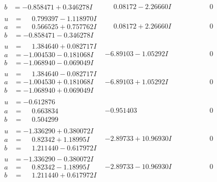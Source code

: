 \documentclass[1p]{elsarticle_modified}
\theoremstyle{definition}
\begin{document}
$$\begin{array}{c|c|c}
\begin{aligned}
b &= -0.858471 + 0.346278 I\end{aligned}
 & \phantom{-}0.08172 - 2.26660 I & \phantom{-0.000000 } 0 \\ \hline\begin{aligned}
u &= \phantom{-}0.799397 - 1.118970 I \\
a &= \phantom{-}0.566525 + 0.757762 I \\
b &= -0.858471 - 0.346278 I\end{aligned}
 & \phantom{-}0.08172 + 2.26660 I & \phantom{-0.000000 } 0 \\ \hline\begin{aligned}
u &= \phantom{-}1.384640 + 0.082717 I \\
a &= -1.004530 - 0.181068 I \\
b &= -1.068940 - 0.069049 I\end{aligned}
 & -6.89103 - 1.05292 I & \phantom{-0.000000 } 0 \\ \hline\begin{aligned}
u &= \phantom{-}1.384640 - 0.082717 I \\
a &= -1.004530 + 0.181068 I \\
b &= -1.068940 + 0.069049 I\end{aligned}
 & -6.89103 + 1.05292 I & \phantom{-0.000000 } 0 \\ \hline\begin{aligned}
u &= -0.612876\phantom{ +0.000000I} \\
a &= \phantom{-}0.663834\phantom{ +0.000000I} \\
b &= \phantom{-}0.504299\phantom{ +0.000000I}\end{aligned}
 & -0.951403\phantom{ +0.000000I} & \phantom{-0.000000 } 0 \\ \hline\begin{aligned}
u &= -1.336290 + 0.380072 I \\
a &= \phantom{-}0.82342 + 1.18995 I \\
b &= \phantom{-}1.211440 - 0.617972 I\end{aligned}
 & -2.89733 + 10.96930 I & \phantom{-0.000000 } 0 \\ \hline\begin{aligned}
u &= -1.336290 - 0.380072 I \\
a &= \phantom{-}0.82342 - 1.18995 I \\
b &= \phantom{-}1.211440 + 0.617972 I\end{aligned}
 & -2.89733 - 10.96930 I & \phantom{-0.000000 } 0 \\ \hline\begin{aligned}

\end{aligned}
\end{array}$$
\end{document}
